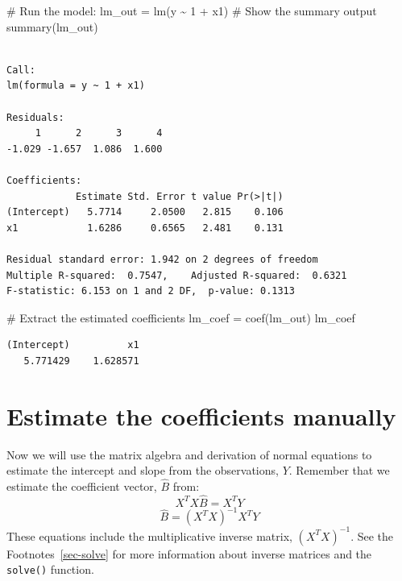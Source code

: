 \documentclass[
  letterpaper,
  DIV=11,
  numbers=noendperiod]{scrreprt}
\newenvironment{Shaded}{\begin{snugshade}}{\end{snugshade}}
\newcommand{\CommentTok}[1]{\textcolor[rgb]{0.37,0.37,0.37}{#1}}
\newcommand{\DecValTok}[1]{\textcolor[rgb]{0.68,0.00,0.00}{#1}}
\newcommand{\FunctionTok}[1]{\textcolor[rgb]{0.28,0.35,0.67}{#1}}
\newcommand{\NormalTok}[1]{\textcolor[rgb]{0.00,0.23,0.31}{#1}}
\newcommand{\OtherTok}[1]{\textcolor[rgb]{0.00,0.23,0.31}{#1}}
\newcommand{\SpecialCharTok}[1]{\textcolor[rgb]{0.37,0.37,0.37}{#1}}
\begin{document}
\begin{Shaded}
\begin{Highlighting}[]
\CommentTok{\# Run the model:}
\NormalTok{lm\_out }\OtherTok{=} \FunctionTok{lm}\NormalTok{(y }\SpecialCharTok{\textasciitilde{}} \DecValTok{1} \SpecialCharTok{+}\NormalTok{ x1)}
\CommentTok{\# Show the summary output}
\FunctionTok{summary}\NormalTok{(lm\_out)}
\end{Highlighting}
\end{Shaded}

\begin{verbatim}

Call:
lm(formula = y ~ 1 + x1)

Residuals:
     1      2      3      4 
-1.029 -1.657  1.086  1.600 

Coefficients:
            Estimate Std. Error t value Pr(>|t|)
(Intercept)   5.7714     2.0500   2.815    0.106
x1            1.6286     0.6565   2.481    0.131

Residual standard error: 1.942 on 2 degrees of freedom
Multiple R-squared:  0.7547,    Adjusted R-squared:  0.6321 
F-statistic: 6.153 on 1 and 2 DF,  p-value: 0.1313
\end{verbatim}

\begin{Shaded}
\begin{Highlighting}[]
\CommentTok{\# Extract the estimated coefficients}
\NormalTok{lm\_coef }\OtherTok{=} \FunctionTok{coef}\NormalTok{(lm\_out)}
\NormalTok{lm\_coef}
\end{Highlighting}
\end{Shaded}

\begin{verbatim}
(Intercept)          x1 
   5.771429    1.628571 
\end{verbatim}

\hypertarget{estimate-the-coefficients-manually}{%
\section{Estimate the coefficients
manually}\label{estimate-the-coefficients-manually}}

Now we will use the matrix algebra and derivation of normal equations to
estimate the intercept and slope from the observations, \(Y\). Remember
that we estimate the coefficient vector, \(\hat{B}\) from:
\[X^TX \hat{B} = X^T Y\] \[\hat{B} = (X^TX)^{-1} X^T Y\] These equations
include the multiplicative inverse matrix, \((X^TX)^{-1}\). See the
Footnotes~\ref{sec-solve} for more information about inverse matrices
and the \texttt{solve()} function.
\end{document}
